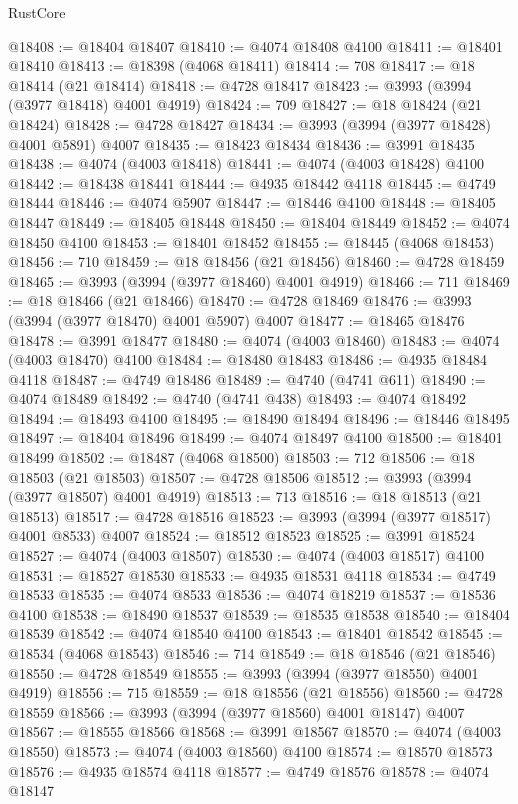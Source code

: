 \begin{lexlean}{RustCore}
\begin{coremodule}
@18408 := @18404 @18407
@18410 := @4074 @18408 @4100
@18411 := @18401 @18410
@18413 := @18398 (@4068 @18411)
@18414 := 708
@18417 := @18 @18414 (@21 @18414)
@18418 := @4728 @18417
@18423 := @3993 (@3994 (@3977 @18418) @4001 @4919)
@18424 := 709
@18427 := @18 @18424 (@21 @18424)
@18428 := @4728 @18427
@18434 := @3993 (@3994 (@3977 @18428) @4001 @5891) @4007
@18435 := @18423 @18434
@18436 := @3991 @18435
@18438 := @4074 (@4003 @18418)
@18441 := @4074 (@4003 @18428) @4100
@18442 := @18438 @18441
@18444 := @4935 @18442 @4118
@18445 := @4749 @18444
@18446 := @4074 @5907
@18447 := @18446 @4100
@18448 := @18405 @18447
@18449 := @18405 @18448
@18450 := @18404 @18449
@18452 := @4074 @18450 @4100
@18453 := @18401 @18452
@18455 := @18445 (@4068 @18453)
@18456 := 710
@18459 := @18 @18456 (@21 @18456)
@18460 := @4728 @18459
@18465 := @3993 (@3994 (@3977 @18460) @4001 @4919)
@18466 := 711
@18469 := @18 @18466 (@21 @18466)
@18470 := @4728 @18469
@18476 := @3993 (@3994 (@3977 @18470) @4001 @5907) @4007
@18477 := @18465 @18476
@18478 := @3991 @18477
@18480 := @4074 (@4003 @18460)
@18483 := @4074 (@4003 @18470) @4100
@18484 := @18480 @18483
@18486 := @4935 @18484 @4118
@18487 := @4749 @18486
@18489 := @4740 (@4741 @611)
@18490 := @4074 @18489
@18492 := @4740 (@4741 @438)
@18493 := @4074 @18492
@18494 := @18493 @4100
@18495 := @18490 @18494
@18496 := @18446 @18495
@18497 := @18404 @18496
@18499 := @4074 @18497 @4100
@18500 := @18401 @18499
@18502 := @18487 (@4068 @18500)
@18503 := 712
@18506 := @18 @18503 (@21 @18503)
@18507 := @4728 @18506
@18512 := @3993 (@3994 (@3977 @18507) @4001 @4919)
@18513 := 713
@18516 := @18 @18513 (@21 @18513)
@18517 := @4728 @18516
@18523 := @3993 (@3994 (@3977 @18517) @4001 @8533) @4007
@18524 := @18512 @18523
@18525 := @3991 @18524
@18527 := @4074 (@4003 @18507)
@18530 := @4074 (@4003 @18517) @4100
@18531 := @18527 @18530
@18533 := @4935 @18531 @4118
@18534 := @4749 @18533
@18535 := @4074 @8533
@18536 := @4074 @18219
@18537 := @18536 @4100
@18538 := @18490 @18537
@18539 := @18535 @18538
@18540 := @18404 @18539
@18542 := @4074 @18540 @4100
@18543 := @18401 @18542
@18545 := @18534 (@4068 @18543)
@18546 := 714
@18549 := @18 @18546 (@21 @18546)
@18550 := @4728 @18549
@18555 := @3993 (@3994 (@3977 @18550) @4001 @4919)
@18556 := 715
@18559 := @18 @18556 (@21 @18556)
@18560 := @4728 @18559
@18566 := @3993 (@3994 (@3977 @18560) @4001 @18147) @4007
@18567 := @18555 @18566
@18568 := @3991 @18567
@18570 := @4074 (@4003 @18550)
@18573 := @4074 (@4003 @18560) @4100
@18574 := @18570 @18573
@18576 := @4935 @18574 @4118
@18577 := @4749 @18576
@18578 := @4074 @18147

\end{coremodule}
\end{lexlean}
